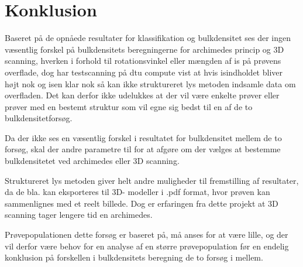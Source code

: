 \chapter{Konklusion}
Baseret på de opnåede resultater for klassifikation og bulkdensitet ses der ingen væsentlig forskel på bulkdensitets beregningerne for archimedes princip og 3D scanning, hverken i forhold til rotationsvinkel eller mængden af is på prøvens overflade, dog har testscanning på dtu compute vist at hvis isindholdet bliver højt nok og isen klar nok så kan ikke struktureret lys metoden indsamle data om overfladen. Det kan derfor ikke udelukkes at der vil være enkelte prøver eller prøver med en bestemt struktur som vil egne sig bedst til en af de to bulkdensitetforsøg. 

Da der ikke ses en væsentlig forskel i resultatet for bulkdensitet mellem de to forsøg, skal der andre parametre til for at afgøre om der vælges at bestemme bulkdensitetet ved archimedes eller 3D scanning. 

Struktureret lys metoden giver helt andre muligheder til fremstilling af resultater, da de bla. kan eksporteres til 3D- modeller i .pdf format, hvor prøven kan sammenlignes med et reelt billede. Dog er erfaringen fra dette projekt at 3D scanning tager lengere tid en archimedes. 

Prøvepopulationen dette forsøg er baseret på, må anses for at være lille, og der vil derfor være  behov for en analyse af en større prøvepopulation før en endelig konklusion på forskellen i bulkdensitets beregning de to forsøg i mellem. 



